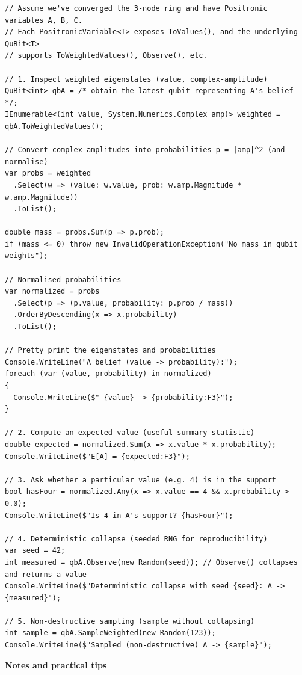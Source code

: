 \documentclass[a4paper,11pt]{article}
\begin{document}
\begin{lstlisting}[style=codeblock]
// Assume we've converged the 3-node ring and have Positronic variables A, B, C.
// Each PositronicVariable<T> exposes ToValues(), and the underlying QuBit<T>
// supports ToWeightedValues(), Observe(), etc.

// 1. Inspect weighted eigenstates (value, complex-amplitude)
QuBit<int> qbA = /* obtain the latest qubit representing A's belief */;
IEnumerable<(int value, System.Numerics.Complex amp)> weighted = qbA.ToWeightedValues();

// Convert complex amplitudes into probabilities p = |amp|^2 (and normalise)
var probs = weighted
  .Select(w => (value: w.value, prob: w.amp.Magnitude * w.amp.Magnitude))
  .ToList();

double mass = probs.Sum(p => p.prob);
if (mass <= 0) throw new InvalidOperationException("No mass in qubit weights");

// Normalised probabilities
var normalized = probs
  .Select(p => (p.value, probability: p.prob / mass))
  .OrderByDescending(x => x.probability)
  .ToList();

// Pretty print the eigenstates and probabilities
Console.WriteLine("A belief (value -> probability):");
foreach (var (value, probability) in normalized)
{
  Console.WriteLine($" {value} -> {probability:F3}");
}

// 2. Compute an expected value (useful summary statistic)
double expected = normalized.Sum(x => x.value * x.probability);
Console.WriteLine($"E[A] = {expected:F3}");

// 3. Ask whether a particular value (e.g. 4) is in the support
bool hasFour = normalized.Any(x => x.value == 4 && x.probability > 0.0);
Console.WriteLine($"Is 4 in A's support? {hasFour}");

// 4. Deterministic collapse (seeded RNG for reproducibility)
var seed = 42;
int measured = qbA.Observe(new Random(seed)); // Observe() collapses and returns a value
Console.WriteLine($"Deterministic collapse with seed {seed}: A -> {measured}");

// 5. Non-destructive sampling (sample without collapsing)
int sample = qbA.SampleWeighted(new Random(123));
Console.WriteLine($"Sampled (non-destructive) A -> {sample}");
\end{lstlisting}

\textbf{Notes and practical tips}
\end{document}
